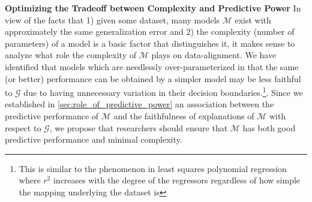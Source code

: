 \documentclass[12pt]{article}  %
\begin{document}
   \noindent\textbf{Optimizing the Tradeoff between Complexity and Predictive Power}
      \label{sec:decreasing_complexity}
      In view of the facts that 1) given some dataset, many models $\mathcal{M}$ exist with approximately the same generalization error \citep{semenova22rashomon} and 2) the complexity (number of parameters) of a model is a basic factor that distinguishes it, it makes sense to analyze what role the complexity of $\mathcal{M}$ plays on data-alignment. We have identified that models which are needlessly over-parameterized in that the same (or better) performance can be obtained by a simpler model may be less faithful to $\mathcal{G}$ due to having unnecessary variation in their decision boundaries.\footnote{This is similar to the phenomenon in least squares polynomial regression where $r^2$ increases with the degree of the regressors regardless of how simple the mapping underlying the dataset is}.
      Since we established in \ref{sec:role_of_predictive_power} an association between the predictive performance of $\mathcal{M}$ and the faithfulness of explanations of $\mathcal{M}$ with respect to $\mathcal{G}$, we propose that researchers should ensure that $\mathcal{M}$ has both good predictive performance and minimal complexity.
      
\end{document}
